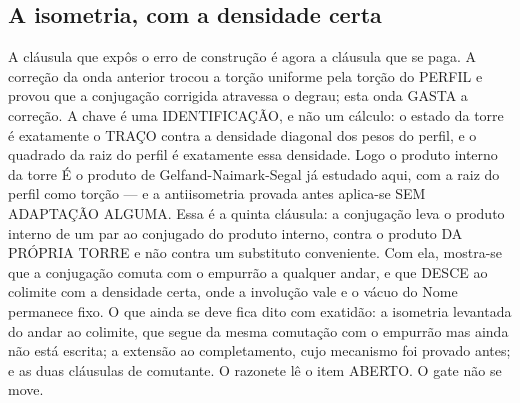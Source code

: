 \documentclass[11pt]{article}
\theoremstyle{definition}\newtheorem{deriv}{Derivação}
\begin{document}
\subsection*{A isometria, com a densidade certa}A cl\'ausula que expôs o erro de constru\c{c}\~ao \'e agora a cl\'ausula que se paga. A corre\c{c}\~ao da onda anterior trocou a tor\c{c}\~ao uniforme pela tor\c{c}\~ao do PERFIL e provou que a conjuga\c{c}\~ao corrigida atravessa o degrau; esta onda GASTA a corre\c{c}\~ao. A chave \'e uma IDENTIFICA\c{C}\~AO, e n\~ao um c\'alculo: o estado da torre \'e exatamente o TRA\c{C}O contra a densidade diagonal dos pesos do perfil, e o quadrado da raiz do perfil \'e exatamente essa densidade. Logo o produto interno da torre \'E o produto de Gelfand-Naimark-Segal j\'a estudado aqui, com a raiz do perfil como tor\c{c}\~ao --- e a antiisometria provada antes aplica-se SEM ADAPTA\c{C}\~AO ALGUMA. Essa \'e a quinta cl\'ausula: a conjuga\c{c}\~ao leva o produto interno de um par ao conjugado do produto interno, contra o produto DA PR\'OPRIA TORRE e n\~ao contra um substituto conveniente. Com ela, mostra-se que a conjuga\c{c}\~ao comuta com o empurr\~ao a qualquer andar, e que DESCE ao colimite com a densidade certa, onde a involu\c{c}\~ao vale e o v\'acuo do Nome permanece fixo. O que ainda se deve fica dito com exatid\~ao: a isometria levantada do andar ao colimite, que segue da mesma comuta\c{c}\~ao com o empurr\~ao mas ainda n\~ao est\'a escrita; a extens\~ao ao completamento, cujo mecanismo foi provado antes; e as duas cl\'ausulas de comutante. O razonete l\^e o item ABERTO. O gate n\~ao se move.
\end{document}
